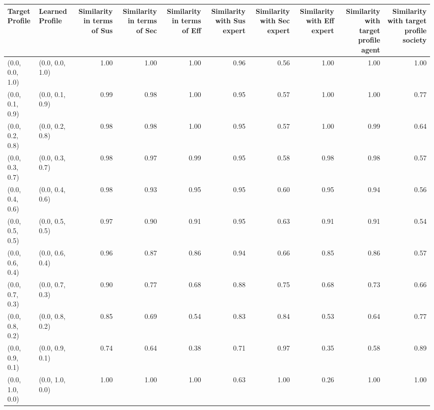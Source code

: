 \begin{tabular}{llrrrrrrrr}
\toprule
Target Profile & Learned Profile & Similarity in terms of Sus & Similarity in terms of Sec & Similarity in terms of Eff & Similarity with Sus expert & Similarity with Sec expert & Similarity with Eff expert & Similarity with target profile agent & Similarity with target profile society \\
\midrule
(0.0, 0.0, 1.0) & (0.0, 0.0, 1.0) & 1.00 & 1.00 & 1.00 & 0.96 & 0.56 & 1.00 & 1.00 & 1.00 \\
(0.0, 0.1, 0.9) & (0.0, 0.1, 0.9) & 0.99 & 0.98 & 1.00 & 0.95 & 0.57 & 1.00 & 1.00 & 0.77 \\
(0.0, 0.2, 0.8) & (0.0, 0.2, 0.8) & 0.98 & 0.98 & 1.00 & 0.95 & 0.57 & 1.00 & 0.99 & 0.64 \\
(0.0, 0.3, 0.7) & (0.0, 0.3, 0.7) & 0.98 & 0.97 & 0.99 & 0.95 & 0.58 & 0.98 & 0.98 & 0.57 \\
(0.0, 0.4, 0.6) & (0.0, 0.4, 0.6) & 0.98 & 0.93 & 0.95 & 0.95 & 0.60 & 0.95 & 0.94 & 0.56 \\
(0.0, 0.5, 0.5) & (0.0, 0.5, 0.5) & 0.97 & 0.90 & 0.91 & 0.95 & 0.63 & 0.91 & 0.91 & 0.54 \\
(0.0, 0.6, 0.4) & (0.0, 0.6, 0.4) & 0.96 & 0.87 & 0.86 & 0.94 & 0.66 & 0.85 & 0.86 & 0.57 \\
(0.0, 0.7, 0.3) & (0.0, 0.7, 0.3) & 0.90 & 0.77 & 0.68 & 0.88 & 0.75 & 0.68 & 0.73 & 0.66 \\
(0.0, 0.8, 0.2) & (0.0, 0.8, 0.2) & 0.85 & 0.69 & 0.54 & 0.83 & 0.84 & 0.53 & 0.64 & 0.77 \\
(0.0, 0.9, 0.1) & (0.0, 0.9, 0.1) & 0.74 & 0.64 & 0.38 & 0.71 & 0.97 & 0.35 & 0.58 & 0.89 \\
(0.0, 1.0, 0.0) & (0.0, 1.0, 0.0) & 1.00 & 1.00 & 1.00 & 0.63 & 1.00 & 0.26 & 1.00 & 1.00 \\
\bottomrule
\end{tabular}
